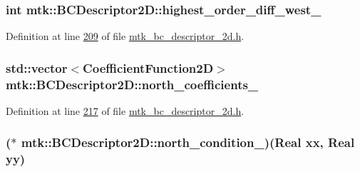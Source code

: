 \hypertarget{classmtk_1_1BCDescriptor2D_aa18ef62f8eda355e47f51bcb5dbe8fe7}{
\subsubsection[{highest\+\_\+order\+\_\+diff\+\_\+west\+\_\+}]{\setlength{\rightskip}{0pt plus 5cm}int mtk\+::\+B\+C\+Descriptor2\+D\+::highest\+\_\+order\+\_\+diff\+\_\+west\+\_\+\hspace{0.3cm}{\ttfamily [private]}}}\label{classmtk_1_1BCDescriptor2D_aa18ef62f8eda355e47f51bcb5dbe8fe7}


Definition at line \hyperlink{mtk__bc__descriptor__2d_8h_source_l00209}{209} of file \hyperlink{mtk__bc__descriptor__2d_8h_source}{mtk\+\_\+bc\+\_\+descriptor\+\_\+2d.\+h}.

\hypertarget{classmtk_1_1BCDescriptor2D_a5429c040c034303dd92dcff554f9efad}{
\subsubsection[{north\+\_\+coefficients\+\_\+}]{\setlength{\rightskip}{0pt plus 5cm}std\+::vector$<${\bf Coefficient\+Function2\+D}$>$ mtk\+::\+B\+C\+Descriptor2\+D\+::north\+\_\+coefficients\+\_\+\hspace{0.3cm}{\ttfamily [private]}}}\label{classmtk_1_1BCDescriptor2D_a5429c040c034303dd92dcff554f9efad}


Definition at line \hyperlink{mtk__bc__descriptor__2d_8h_source_l00217}{217} of file \hyperlink{mtk__bc__descriptor__2d_8h_source}{mtk\+\_\+bc\+\_\+descriptor\+\_\+2d.\+h}.

\hypertarget{classmtk_1_1BCDescriptor2D_a23e0b9ae755dcf81841aa24ddaf0b090}{
\subsubsection[{north\+\_\+condition\+\_\+}]{($\ast$ mtk\+::\+B\+C\+Descriptor2\+D\+::north\+\_\+condition\+\_\+)({\bf Real} xx, {\bf Real} yy)\hspace{0.3cm}{\ttfamily [private]}}}\label{classmtk_1_1BCDescriptor2D_a23e0b9ae755dcf81841aa24ddaf0b090}


